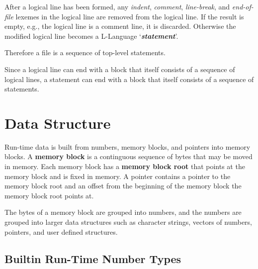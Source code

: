 \documentclass[12pt]{article}
\newcommand{\key}[1]{{\rm \bfseries #1}}
\newcommand{\emkey}[1]{{\em \bfseries #1}}
\begin{document}
After a logical line
has been formed, any {\em indent},
{\em comment}, {\em line-break}, and {\em end-of-file}
lexemes in the logical line
are removed from the logical line.  If the result is
empty, e.g., the logical line is a comment line, it is discarded.
Otherwise the
modified logical line becomes a L-Language
`\emkey{statement}'\label{STATEMENT}.

Therefore a file is a sequence of top-level statements.

Since a logical line can end with a block that itself consists
of a sequence of logical lines, a statement can end with
a block that itself consists of a sequence of statements.

\newpage

\section{Data Structure}

Run-time data is built from numbers, memory blocks,
and pointers into memory blocks.
A \key{memory block} is a continguous sequence of bytes that may be moved
in memory.  Each memory block has a \key{memory block root}
that points at the memory block and
is fixed in memory.  A pointer contains a pointer to the memory block
root and an
offset from the beginning of the memory block the memory block root points at.

The bytes of a memory block are grouped into numbers, and the numbers are
grouped into larger data structures such as character strings, vectors
of numbers, pointers, and user defined structures.

\subsection{Builtin Run-Time Number Types}
\label{BUILTIN-RUN-TIME-NUMBER-TYPES}
\end{document}
